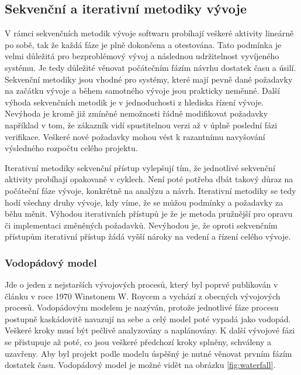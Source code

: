 \documentclass[czech,master,public,dept460,male,cpdeclaration,oneside]{diploma}
\begin{document}
\subsection{Sekvenční a iterativní metodiky vývoje}
V rámci sekvenčních metodik vývoje softwaru probíhají veškeré aktivity lineárně po sobě, tak že každá fáze je plně dokončena a otestována. Tato podmínka je velmi důležitá pro bezproblémový vývoj a následnou udržitelnost vyvíjeného systému. Je tedy důležité věnovat počátečním fázím návrhu dostatek času a úsilí. Sekvenční metodiky jsou vhodné pro systémy, které mají pevně dané požadavky na začátku vývoje a během samotného vývoje jsou prakticky neměnné. Další výhoda sekvenčních metodik je  v jednoduchosti z hlediska řízení vývoje. Nevýhoda je kromě již zmíněné nemožnosti řádně modifikovat požadavky například v tom, že zákazník vidí spustitelnou verzi až v úplně poslední fázi verifikace. Veškeré nové požadavky mohou vést k razantnímu navyšování výsledného rozpočtu celého projektu.

Iterativní metodiky sekvenční přístup vylepšují tím, že jednotlivé sekvenční aktivity probíhají opakovaně v cyklech. Není poté potřeba dbát takový důraz na počáteční fáze vývoje, konkrétně na analýzu a návrh. Iterativní metodiky se tedy hodí všechny druhy vývoje, kdy víme, že se můžou podmínky a požadavky za běhu měnit. Výhodou iterativních přístupů je že je metoda pružnější pro opravu či implementaci změněných požadavků. Nevýhodou je, že oproti sekvenčním přístupům iterativní přístup žádá vyšší nároky na vedení a řízení celého vývoje. 

\subsubsection{Vodopádový model}
Jde o jeden z nejstarších vývojových procesů, který byl poprvé publikován v článku v roce 1970 Winstonem W. Roycem a vychází z obecných vývojových procesů. Vodopádovým modelem je nazýván, protože jednotlivé fáze procesu postupně kaskádovitě navazují na sebe a celý model poté vypadá jako vodopád. Veškeré kroky musí být pečlivě analyzovány a naplánovány. K další vývojové fázi se přistupuje až poté, co jsou veškeré předchozí kroky splněny, schváleny a uzavřeny. \cite{ref:sommerrville_waterfall} Aby byl projekt podle modelu úspěšný je nutné věnovat prvním fázím dostatek času. Vodopádový model je možné vidět na obrázku \ref{fig:waterfall}.
\end{document}
